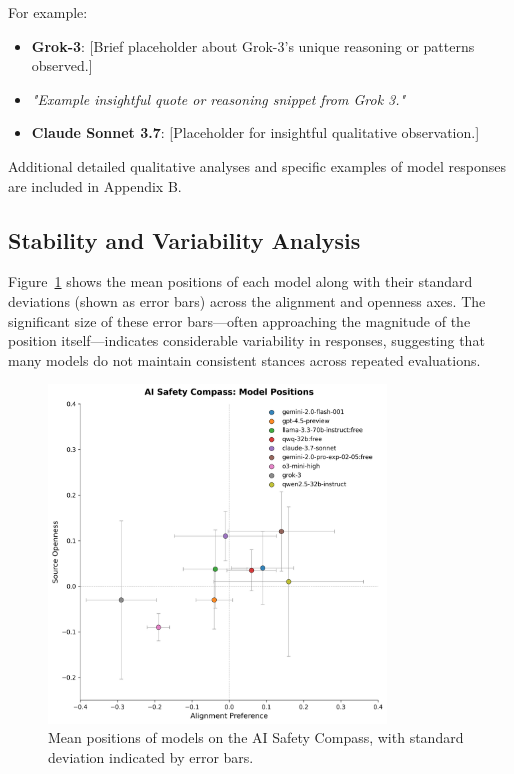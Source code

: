 For example:

\begin{itemize}
    \item \textbf{Grok-3}: [Brief placeholder about Grok-3’s unique reasoning or patterns observed.]
    \item \textit{"Example insightful quote or reasoning snippet from Grok 3."}

    \item \textbf{Claude Sonnet 3.7}: [Placeholder for insightful qualitative observation.]


\end{itemize}

Additional detailed qualitative analyses and specific examples of model responses are included in Appendix B.

\subsection{Stability and Variability Analysis}

Figure~\ref{fig:compass_variance} shows the mean positions of each model along with their standard deviations (shown as error bars) across the alignment and openness axes. The significant size of these error bars—often approaching the magnitude of the position itself—indicates considerable variability in responses, suggesting that many models do not maintain consistent stances across repeated evaluations.

\begin{figure}[htbp]
    \centering
    \includegraphics[width=0.8\textwidth]{figures/compass_with_error_bars.png}
    \caption{Mean positions of models on the AI Safety Compass, with standard deviation indicated by error bars.}
    \label{fig:compass_variance}
\end{figure}

